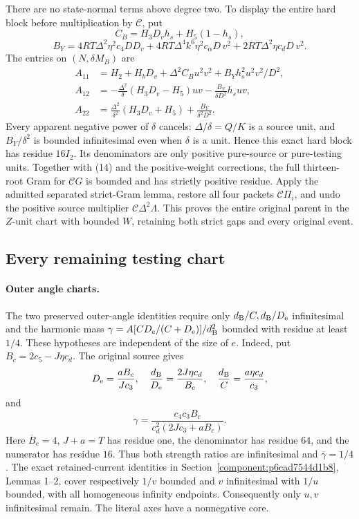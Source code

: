 There are no state-normal terms above degree two. To display the
entire hard block before multiplication by $\mathcal C$, put
\[
 C_B=H_3D_vh_s+H_5(1-h_s),
\]
\[
 B_Y=4RT\Delta^2\eta^2c_4DD_v
      +4RT\Delta^4k^6\eta^2c_\alpha D\,v^2
      +2RT\Delta^2\eta c_dD\,v^2.
\]
The entries on $(N,\delta M_B)$ are
\begin{align*}
 A_{11}&=H_2+H_bD_v+\Delta^2C_Bu^2v^2
                         +B_Yh_s^2u^2v^2/D^2,\\
 A_{12}&=-\frac{\Delta^2}{\delta}(H_3D_v-H_5)uv
                         -\frac{B_Y}{\delta D^2}h_suv,\\
 A_{22}&=\frac{\Delta^2}{\delta^2}(H_3D_v+H_5)
                         +\frac{B_Y}{\delta^2D^2}.
\end{align*}
Every apparent negative power of $\delta$ cancels: $\Delta/\delta=Q/K$
is a source unit, and $B_Y/\delta^2$ is bounded infinitesimal even
when $\delta$ is a unit. Hence this exact hard block has residue
$16I_2$. Its denominators are only positive pure-source or
pure-testing units. Together with (14) and the positive-weight
corrections, the full thirteen-root Gram for $\mathcal CG$ is bounded
and has strictly positive residue. Apply the admitted separated
strict-Gram lemma, restore all four packets $\mathcal C\Pi_i$,
and undo the positive source multiplier $\mathcal C\Delta^2\Lambda$.
This proves the entire original parent in the $Z$-unit chart with
bounded $W$, retaining both strict gaps and every original event.

\subsection*{Every remaining testing chart}

\paragraph{Outer angle charts.}
The two preserved outer-angle identities require only
$d_{\rm B}/C,d_{\rm B}/D_{\rm e}$ infinitesimal and the harmonic
mass $\gamma=A[CD_{\rm e}/(C+D_{\rm e})]/d_{\rm B}^2$ bounded
with residue at least $1/4$. These hypotheses are independent of the
size of $e$. Indeed, put $B_c=2c_5-J\eta c_d$. The original source gives
\[
 D_{\rm e}=\frac{aB_c}{Jc_3},\quad
 \frac{d_{\rm B}}{D_{\rm e}}=\frac{2J\eta c_d}{B_c},\quad
 \frac{d_{\rm B}}C=\frac{a\eta c_d}{c_3},
\]
and
\[
 \gamma=\frac{c_4c_3B_c}{c_d^2(2Jc_3+aB_c)}.
\]
Here $\overline B_c=4$, $J+a=T$ has residue one, the denominator
has residue $64$, and the numerator has residue $16$. Thus both
strength ratios are infinitesimal and $\overline\gamma=1/4$.
The exact retained-current identities in
Section~\ref{component:p6cad7544d1b8}, Lemmas 1--2, cover respectively
$1/v$ bounded and $v$ infinitesimal with $1/u$ bounded, with all
homogeneous infinity endpoints. Consequently only $u,v$
infinitesimal remain. The literal axes have a nonnegative core.

